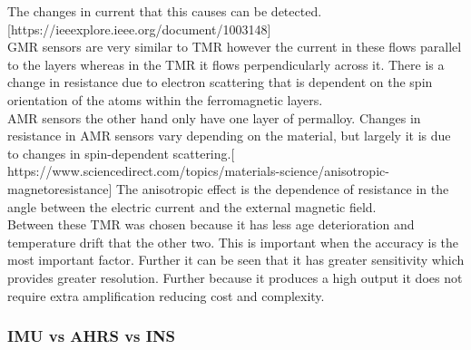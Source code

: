\documentclass[11pt]{article}		%
\begin{document}
            The changes in current that this causes can be detected. [https://ieeexplore.ieee.org/document/1003148]
            \\
            GMR sensors are very similar to TMR however the current in these flows parallel to the layers whereas in the TMR it flows perpendicularly across it.
            There is a change in resistance due to electron scattering that is dependent on the spin orientation of the atoms within the ferromagnetic layers.
            \\
            AMR sensors the other hand only have one layer of permalloy. 
            Changes in resistance in AMR sensors vary depending on the material, but largely it is due to changes in spin-dependent scattering.[  https://www.sciencedirect.com/topics/materials-science/anisotropic-magnetoresistance]
            The anisotropic effect is the dependence of resistance in the angle between the electric current and the external magnetic field.
            \\
            Between these TMR was chosen because it has less age deterioration and temperature drift that the other two. 
            This is important when the accuracy is the most important factor. 
            Further it can be seen that it has greater sensitivity which provides greater resolution. Further because it produces a high output it does not require extra amplification reducing cost and complexity. 
            

            \subsubsection{IMU vs AHRS vs INS}
            
\end{document}
